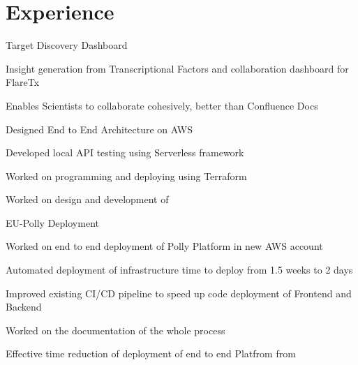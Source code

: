 \documentclass[]{single-page-resume}
\begin{document}
\begin{minipage}[t]{0.66\textwidth} 


\section{Experience}

\vspace{\topsep} %
Target Discovery Dashboard 
\vspace{\topsep} %
\begin{tightemize}
   \item Insight generation from Transcriptional Factors and collaboration dashboard for FlareTx
   \item Enables Scientists to collaborate cohesively, better than Confluence Docs
    \item Designed End to End   Architecture on AWS
    \item Developed local API testing using Serverless framework
    \item Worked on programming and deploying  using Terraform
    \item Worked on design and development of  
\end{tightemize}
\vspace{\topsep} %
EU-Polly Deployment
\begin{tightemize}
   \item Worked on end to end deployment of Polly Platform in new AWS account
   \item Automated deployment of infrastructure  time to deploy from 1.5 weeks to 2 days
    \item Improved existing CI/CD pipeline to speed up code deployment of Frontend and Backend
    \item Worked on the documentation of the whole process
    \item Effective time reduction of deployment of end to end Platfrom from 
\end{tightemize}

\end{minipage}
\end{document}
